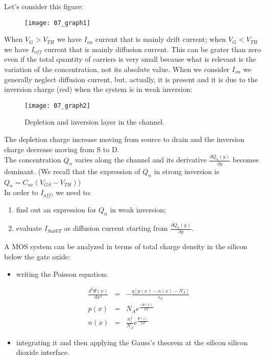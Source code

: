 \documentclass[a4paper, 12pt, twoside, openright]{report}
\begin{document}
Let's consider this figure:

	\begin{figure}[H]
	\centering
	\texttt{[image: 07\_graph1]}
	\caption{}
	\label{}
	\end{figure}

When $V_G > V_{TH}$ we have $I_{on}$ current that is mainly drift current; when $V_G < V_{TH}$ we have $I_{off}$ current that is mainly diffusion current. This can be grater than zero even if the total quantity of carriers is very small because what is relevant is the variation of the concentration, not its absolute value. When we consider $I_{on}$ we generally neglect diffusion current, but, actually, it is present and it is due to the inversion charge (red) when the system is in weak inversion:

	\begin{figure}[H]
	\centering
	\texttt{[image: 07\_graph2]}
	\caption{Depletion and inversion layer in the channel.}
	\label{}
	\end{figure}

The depletion charge increase moving from source to drain and the inversion charge decrease moving from S to D.\\
The concentration $Q_{n}$ varies along the channel and its derivative $\frac{\partial Q_n (y)}{\partial y}$ becomes dominant.
(We recall that the expression of $Q_{n}$ in strong inversion is $Q_{n} = C_{ox} (V_{GS} - V_{TH})$)\\
In order to  $I_{off}$, we need to:

\begin{enumerate}
\item find out an expression for $Q_{n}$ in weak inversion;
\item evaluate $I_{SubVT}$ as diffusion current starting from $\frac{\partial Q_n (y)}{\partial y}$.
\end{enumerate}

A MOS system can be analyzed in terms of total charge density in the silicon below the gate oxide:

\begin{itemize}
\item writing the Poisson equation:
	
	\begin{eqnarray*}
	\frac{d^2  {\Psi(x)}}{dx^2} &=& -\frac{q \left[ p(x)-n(x)-N_A^- \right]}{\epsilon_S}\\[1ex]
	p(x)&=&N_A e^{\displaystyle\frac{- {\Psi(x)}}{kT}}\\[2ex]
	n(x)&=&\frac{n_i^2}{N_A}e^{\displaystyle\frac{ {\Psi(x)}}{kT}}
	\end{eqnarray*}

\item integrating it and then applying the Gauss’s theorem at the silicon silicon dioxide interface.
\end{itemize}
\end{document}
